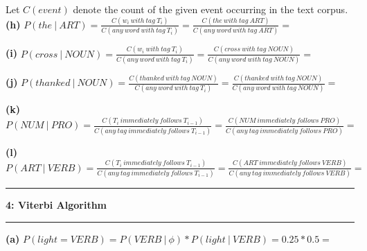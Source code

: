 \documentclass[11pt]{article}
\newcommand\question[2]{\vspace{.25in}\hrule\textbf{#1: #2}\vspace{.5em}\hrule\vspace{.10in}}
\renewcommand\part[1]{\vspace{.10in}\textbf{(#1)}}
\begin{document}
Let $C(event)$ denote the count of the given event occurring in the text corpus. \newline
\part{h} $P(the \ | \ ART) = \frac{C(w_i \ with \ tag \ T_i)}{C(any \ word \ with \ tag \ T_i)} = \frac{C(the \ with \ tag \ ART)}{C(any \ word \ with \ tag \ ART)} = \ $

\part{i} $P(cross \ | \ NOUN) = \frac{C(w_i \ with \ tag \ T_i)}{C(any \ word \ with \ tag \ T_i)} = \frac{C(cross \ with \ tag \ NOUN)}{C(any \ word \ with \ tag \ NOUN)} = \ $

\part{j} $P(thanked \ | \ NOUN) = \frac{C(thanked \ with \ tag \ NOUN)}{C(any \ word \ with \ tag \ T_i)} = \frac{C(thanked \ with \ tag \ NOUN)}{C(any \ word \ with \ tag \ NOUN)} = \ $

\part{k} $P(NUM \ | \ PRO) = \frac{C(T_i \ immediately \ follows \ T_{i-1})}{C(any \ tag \ immediately \ follows \ T_{i- 1})} = \frac{C(NUM \ immediately \ follows \ PRO)}{C(any \ tag \ immediately \ follows \ PRO)} = \ $

\part{l} $P(ART \ | \ VERB) = \frac{C(T_i \ immediately \ follows \ T_{i-1})}{C(any \ tag \ immediately \ follows \ T_{i- 1})} = \frac{C(ART \ immediately \ follows \ VERB)}{C(any \ tag \ immediately \ follows \ VERB)} = \ $

\newpage

\question{4}{Viterbi Algorithm}

\part{a} $P(light=VERB) = P(VERB\ | \ \phi) * P(light \ | \ VERB) = 0.25 * 0.5 =$ 
\end{document}
